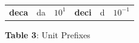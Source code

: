 {{\begin{center}
\begin{tabular}[t]{|l|l|l|l|l|l|}
                \textbf{deca}
               &
    
    
        da &
    
    
        
                \begin{math}{10}^{1}\end{math}
               &
    
    
        
                \textbf{deci}
               &
    
    
        d &
    
    
        
                \begin{math}{10}^{-1}\end{math}
     \tabularnewline\cline{1-1}\cline{2-2}\cline{3-3}\cline{4-4}\cline{5-5}\cline{6-6}
    \end{tabular}
      \end{center}
    \begin{center}{\small\bfseries Table 3}: Unit Prefixes\end{center}
    
    \addtocounter{footnote}{-0}
    
          }{ %
        
}}
